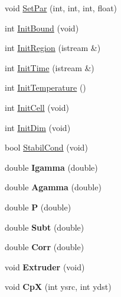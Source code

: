 \begin{DoxyCompactItemize}
\item 
void \hyperlink{class_csim2d_aaf0714ca65dbc0f89ad349c220242d8e}{Set\+Par} (int, int, int, float)
\item 
int \hyperlink{class_csim2d_a6e5964558904649d6e3cde3b4ade657f}{Init\+Bound} (void)
\item 
int \hyperlink{class_csim2d_a7d7bd87570f84431c5be7ae4830650c2}{Init\+Region} (istream \&)
\item 
int \hyperlink{class_csim2d_a4e7b7c3acdb5358acceb203fccc3da9c}{Init\+Time} (istream \&)
\item 
int \hyperlink{class_csim2d_a586225befca4c4d557971a6b72242310}{Init\+Temperature} ()
\item 
int \hyperlink{class_csim2d_ad752eb0aeedf1094cf2ff4acc3adb17b}{Init\+Cell} (void)
\item 
int \hyperlink{class_csim2d_ab9134185e2eedaaa5cf8173c5aed8e42}{Init\+Dim} (void)
\item 
bool \hyperlink{class_csim2d_a0a4a41aaf24e7cf6fa8714cff15308bc}{Stabil\+Cond} (void)
\item 
\hypertarget{class_csim2d_aa5bc5df66737aa3c43a4f6f7594316ce}{}double {\bfseries Igamma} (double)\label{class_csim2d_aa5bc5df66737aa3c43a4f6f7594316ce}

\item 
\hypertarget{class_csim2d_af54b2bf65597e1016f646a8870c2b2ff}{}double {\bfseries Agamma} (double)\label{class_csim2d_af54b2bf65597e1016f646a8870c2b2ff}

\item 
\hypertarget{class_csim2d_a96e18f7614b443b9f97d8f51145194b9}{}double {\bfseries P} (double)\label{class_csim2d_a96e18f7614b443b9f97d8f51145194b9}

\item 
\hypertarget{class_csim2d_aa41b07a3cb149df55aa347c2ecf54b53}{}double {\bfseries Subt} (double)\label{class_csim2d_aa41b07a3cb149df55aa347c2ecf54b53}

\item 
\hypertarget{class_csim2d_af1c28e94075c2d3ae1d377ee64a70611}{}double {\bfseries Corr} (double)\label{class_csim2d_af1c28e94075c2d3ae1d377ee64a70611}

\item 
\hypertarget{class_csim2d_a06eeaecf19558e49c2897002c7f91588}{}void {\bfseries Extruder} (void)\label{class_csim2d_a06eeaecf19558e49c2897002c7f91588}

\item 
\hypertarget{class_csim2d_a159fdfe2128b9fdbb2e5b66ea4eb55d4}{}void {\bfseries Cp\+X} (int ysrc, int ydst)\label{class_csim2d_a159fdfe2128b9fdbb2e5b66ea4eb55d4}


\end{DoxyCompactItemize}
